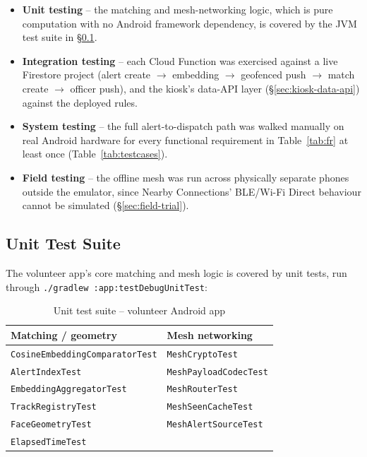 \documentclass[12pt,a4paper,oneside]{report}
\newcommand{\code}[1]{\texttt{#1}}
\begin{document}
\begin{itemize}
  \item \textbf{Unit testing} -- the matching and mesh-networking logic,
        which is pure computation with no Android framework dependency, is
        covered by the JVM test suite in \S\ref{sec:unit-tests}.
  \item \textbf{Integration testing} -- each Cloud Function was exercised
        against a live Firestore project (alert create $\to$ embedding
        $\to$ geofenced push $\to$ match create $\to$ officer push), and the
        kiosk's data-API layer (\S\ref{sec:kiosk-data-api}) against the deployed rules.
  \item \textbf{System testing} -- the full alert-to-dispatch path was
        walked manually on real Android hardware for every functional
        requirement in Table~\ref{tab:fr} at least once (Table~\ref{tab:testcases}).
  \item \textbf{Field testing} -- the offline mesh was run across
        physically separate phones outside the emulator, since Nearby
        Connections' BLE/Wi-Fi Direct behaviour cannot be simulated
        (\S\ref{sec:field-trial}).
\end{itemize}

\subsection{Unit Test Suite}
\label{sec:unit-tests}

The volunteer app's core matching and mesh logic is covered by unit tests,
run through \code{./gradlew :app:testDebugUnitTest}:

\begin{table}[H]
\centering
\caption{Unit test suite -- volunteer Android app}
\begin{tabular}{|p{6.0cm}|p{6.0cm}|}
\hline
\textbf{Matching / geometry} & \textbf{Mesh networking} \\
\hline
\code{CosineEmbeddingComparatorTest} & \code{MeshCryptoTest} \\ \hline
\code{AlertIndexTest} & \code{MeshPayloadCodecTest} \\ \hline
\code{EmbeddingAggregatorTest} & \code{MeshRouterTest} \\ \hline
\code{TrackRegistryTest} & \code{MeshSeenCacheTest} \\ \hline
\code{FaceGeometryTest} & \code{MeshAlertSourceTest} \\ \hline
\code{ElapsedTimeTest} & \\
\hline
\end{tabular}
\end{table}
\end{document}
